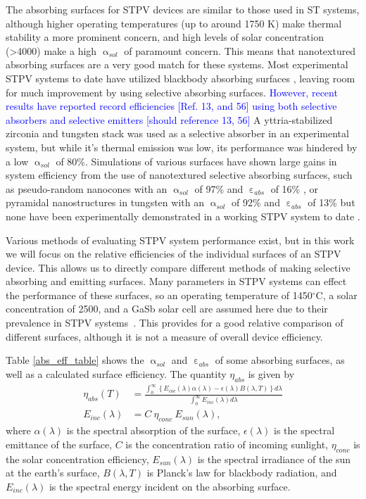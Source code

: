 \documentclass[10pt,letterpaper]{article}
\begin{document}
{The absorbing surfaces for STPV devices are similar to those used in ST systems, although higher operating temperatures (up to around 1750 K) make thermal 
stability a more prominent concern, and high levels of solar concentration (\textgreater4000) make a high $\upalpha_{sol}$ of paramount concern.  This means 
that nanotextured absorbing surfaces are a very good match for these systems.  Most experimental STPV systems to date have utilized blackbody absorbing 
surfaces \cite{exp_tokyo,exp_madrid,exp_russia,MIT_paper}, leaving room for much improvement by using selective absorbing 
surfaces.   \textcolor{blue}{However, recent results have reported record efficiencies [Ref. 13, and 56] using both 
selective absorbers and selective emitters [should reference 13, 56]}  A yttria-stabilized zirconia and tungsten stack was used as a 
selective absorber in an experimental system, but while it's thermal emission was low, its performance was 
hindered by a low $\upalpha_{sol}$ of 80\%.  Simulations of various surfaces have shown large gains in system 
efficiency from the use of nanotextured selective absorbing surfaces, such as pseudo-random nanocones 
with an $\upalpha_{sol}$ of 97\% and $\upepsilon_{abs}$ of 16\% \cite{me1}, or pyramidal nanostructures in 
tungsten with an $\upalpha_{sol}$ of 92\% and $\upepsilon_{abs}$ of 13\% \cite{paper1_ref4} but none have been 
experimentally demonstrated in a working STPV system to date \cite{paper1_ref5,paper1_ref6}.

Various methods of evaluating STPV system performance exist, but in this work we will focus on the relative efficiencies of the individual surfaces of an STPV device.  This allows us to directly compare different methods of making selective absorbing and emitting surfaces.  Many parameters in STPV systems can effect the performance of these surfaces, so an operating temperature of 1450$^\circ$C, a solar concentration of 2500, and a GaSb solar cell are assumed here due to their prevalence in STPV systems~\cite{exp_tokyo,exp_madrid,exp_russia,me1,me2,RF_OptExp_2009}.  This provides for a good relative comparison of different surfaces, although it is not a measure of overall device efficiency.

Table \ref{abs_eff_table} shows the $\upalpha_{sol}$ and $\upepsilon_{abs}$ of some absorbing surfaces, as well as a calculated surface efficiency.  The quantity $\eta_{abs}$ is given by
\begin{align}
\label{overall_sss_eq}\eta_{abs}(T)& = \frac{\int_{0}^{\infty}\left\{E_{inc}(\lambda)\alpha(\lambda)-\epsilon(\lambda)B(\lambda,T)\right\}d\lambda}{\int_{0}^{\infty}E_{inc}(\lambda)d\lambda}\\
\label{e_incident}E_{inc}(\lambda) &= C \: \eta_{conc} \: E_{sun}(\lambda),
\end{align}
where $\alpha(\lambda)$ is the spectral absorption of the surface, $\epsilon(\lambda)$ is the spectral emittance of the surface, $C$ is the concentration ratio of incoming sunlight, 
$\eta_{conc}$ is the solar concentration efficiency, $E_{sun}(\lambda)$ is the 
spectral irradiance of the sun at the earth's surface, $B(\lambda, T)$ is 
Planck's law for blackbody radiation, and $E_{inc}(\lambda)$ is the spectral 
energy incident on the absorbing surface.

}
\end{document}
